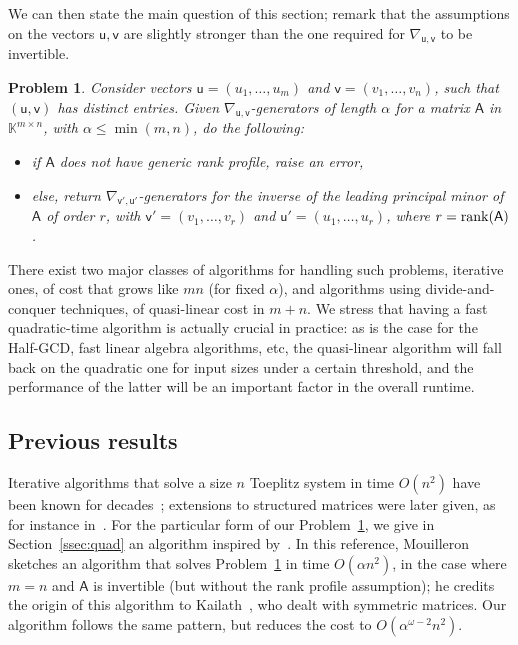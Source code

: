 \documentclass{sig-alternate}
\newcommand{\vu}{\ensuremath{\mathsf{u}}}
\newcommand{\vv}{\ensuremath{\mathsf{v}}}
\newcommand{\mA}{\ensuremath{\mathsf{A}}}
\newcommand{\K}{\ensuremath{\mathbb{K}}}
\newtheorem{pbm}{Problem}
\begin{document}
We can then state the main question of this section; remark that the
assumptions on the vectors $\vu,\vv$ are slightly stronger than the one
required for $\nabla_{\vu,\vv}$ to be invertible.
\begin{pbm}\label{pb:cauchy}
  Consider vectors $\vu=(u_1,\dots,u_m)$ and $\vv=(v_1,\dots,v_n)$,
  such that $(\vu,\vv)$ has distinct entries. Given
  $\nabla_{\vu,\vv}$-generators of length $\alpha$ for a matrix $\mA$
  in $\K^{m \times n}$, with $\alpha \le \min(m,n)$, do the following:
  \begin{itemize}
  \item if $\mA$ does not have generic rank profile, raise an error,
  \item else, return $\nabla_{\vv',\vu'}$-generators for the inverse
    of the leading principal minor of $\mA$ of order $r$, with
    $\vv'=(v_1,\dots,v_r)$ and $\vu'=(u_1,\dots,u_r)$, where
    $r={\rm rank}(\mA)$.
\end{itemize}
\end{pbm}
There exist two major classes of algorithms for handling such
problems, iterative ones, of cost that grows like $mn$ (for fixed
$\alpha$), and algorithms using divide-and-conquer techniques, of
quasi-linear cost in $m+n$. We stress that having a fast
quadratic-time algorithm is actually crucial in practice: as is the
case for the Half-GCD, fast linear algebra algorithms, etc, the
quasi-linear algorithm will fall back on the quadratic one for input
sizes under a certain threshold, and the performance of the latter
will be an important factor in the overall runtime. 


\subsection{Previous results}

Iterative algorithms that solve a size $n$ Toeplitz system in time
$O(n^2)$ have been known for
decades~\cite{Levinson47,Durbin60,Trench64}; extensions to
structured matrices were later given, as for instance
in~\cite{KaGoOl95}. For the particular form of our
Problem~\ref{pb:cauchy}, we give in Section~\ref{ssec:quad} an
algorithm inspired by~\cite[Algorithme~4]{Mouilleron08}. In this
reference, Mouilleron sketches an algorithm that solves
Problem~\ref{pb:cauchy} in time $O(\alpha n^2)$, in the case where
$m=n$ and $\mA$ is invertible (but without the rank profile
assumption); he credits the origin of this algorithm to
Kailath~\cite[\S1.10]{KaSa99}, who dealt with symmetric matrices.
Our algorithm follows the same pattern, but reduces the cost to 
$O(\alpha^{\omega-2} n^2)$.
\end{document}
